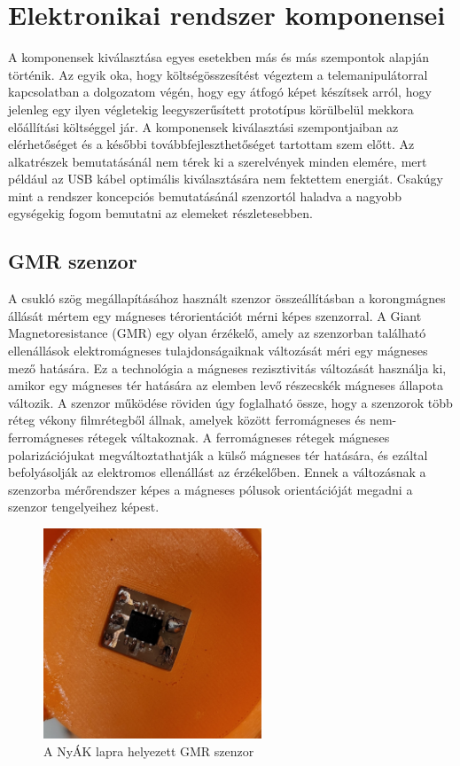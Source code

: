 \section{Elektronikai rendszer komponensei}

A komponensek kiválasztása egyes esetekben más és más szempontok alapján történik. Az egyik oka, hogy költségösszesítést végeztem a telemanipulátorral kapcsolatban a dolgozatom végén, hogy egy átfogó képet készítsek arról, hogy jelenleg egy ilyen végletekig leegyszerűsített prototípus körülbelül mekkora előállítási költséggel jár. A komponensek kiválasztási szempontjaiban az elérhetőséget és a későbbi továbbfejleszthetőséget tartottam szem előtt. Az alkatrészek bemutatásánál nem térek ki a szerelvények minden elemére, mert például az USB kábel optimális kiválasztására nem fektettem energiát. Csakúgy mint a rendszer koncepciós bemutatásánál szenzortól haladva a nagyobb egységekig fogom bemutatni az elemeket részletesebben.\cite{vezetekellen}

\subsection{GMR szenzor}
\label{sec:gmr_leiras}

A csukló szög megállapításához használt szenzor összeállításban a korongmágnes állását mértem egy mágneses térorientációt mérni képes szenzorral. A Giant Magnetoresistance (GMR) egy olyan érzékelő, amely az szenzorban található ellenállások elektromágneses tulajdonságaiknak változását méri egy mágneses mező hatására. Ez a technológia a mágneses rezisztivitás változását használja ki, amikor egy mágneses tér hatására az elemben levő részecskék mágneses állapota változik. A szenzor működése röviden úgy foglalható össze, hogy a szenzorok több réteg vékony filmrétegből állnak, amelyek között ferromágneses és nem-ferromágneses rétegek váltakoznak. A ferromágneses rétegek mágneses polarizációjukat megváltoztathatják a külső mágneses tér hatására, és ezáltal befolyásolják az elektromos ellenállást az érzékelőben. Ennek a változásnak a szenzorba mérőrendszer képes a mágneses pólusok orientációját megadni a szenzor tengelyeihez képest.\cite{tlesensor}

\begin{figure}[!ht]
\centering
\includegraphics[width=65mm, keepaspectratio]{figures/Csuklo_szog_teszt/szenzor}
\caption{A NyÁK lapra helyezett GMR szenzor}
\label{fig:csuklo_szenzor_pcb}
\end{figure}

